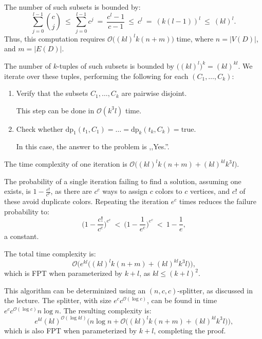 \documentclass[12pt]{article}
\begin{document}
	\medskip
	
	The number of such subsets is bounded by:
	\[ \sum\limits_{j = 0}^{l - 1} \binom{c}{j} \ \leqslant \
	\sum\limits_{j = 0}^{l - 1} c^{j} \ = \ \frac{c^{l} - 1}{c - 1} \ \leqslant
	\ c^{l} \ = \ (k (l - 1))^{l} \ \leqslant \ (kl)^{l} \text{.} \]
	Thus, this computation requires \(\mathcal{O} \big( (kl)^{l} k (n + m)
	\big)\) time, where \(n = |V(D)|\), and \(m = |E(D)|\).
	
	\medskip
	
	The number of \(k\)-tuples of such subsets is bounded by \(\big( (kl)^l
	\big)^{k} = (kl)^{kl}\). We iterate over these tuples, performing the
	following for each \((C_{1}, \ldots, C_{k})\):
	\begin{enumerate}
		\item Verify that the subsets \(C_{1}, \ldots, C_{k}\) are pairwise
		      disjoint.
		      
		      This step can be done in \(\mathcal{O}(k^{3} l)\) time.
		
		\item Check whether \(\text{dp}_{1}(t_{1}, C_{1}) = \ldots =
		      \text{dp}_{k}(t_{k}, C_{k}) = \text{true}\).
		      
		      In this case, the answer to the problem is ,,Yes.''.
	\end{enumerate}
	The time complexity of one iteration is \(\mathcal{O} \big( (kl)^l k (n + m)
	+ (kl)^{kl} k^{3} l \big)\).
	
	\medskip
	
	The probability of a single iteration failing to find a solution, assuming
	one exists, is \(1 - \frac{c!}{c^{c}}\), as there are \(c^{c}\) ways to
	assign \(c\) colors to \(c\) vertices, and \(c!\) of these avoid duplicate
	colors. Repeating the iteration \(e^{c}\) times reduces the failure
	probability to:
	\[ \bigg( 1 - \frac{c!}{c^{c}} \bigg)^{e^{c}} \ < \ \bigg( 1 -
	\frac{1}{e^{c}} \bigg)^{e^{c}} \ < \ 1 - \frac{1}{e} \text{,} \]
	a constant.
	
	\medskip
	
	The total time complexity is:
	\[ \mathcal{O} \big( e^{kl} \big( (kl)^l k (n + m) + (kl)^{kl} k^{3} l \big)
	\big) \text{,} \]
	which is FPT when parameterized by \(k + l\), as \(kl \leqslant
	(k + l)^{2}\).
	
	\medskip
	
	This algorithm can be determinized using an \((n, c, c)\)-splitter, as
	discussed in the lecture. The splitter, with size \(e^{c}
	c^{\mathcal{O}(\log c)}\), can be found in time \(e^{c}
	c^{\mathcal{O}(\log c)} n \log n\). The resulting complexity is:
	\[ e^{kl} (kl)^{\mathcal{O}(\log kl)} \big( n \log n + \mathcal{O} \big(
	(kl)^l k (n + m) + (kl)^{kl} k^{3} l \big) \big) \text{,} \]
	which is also FPT when parameterized by \(k + l\), completing the proof.
	
\end{document}

